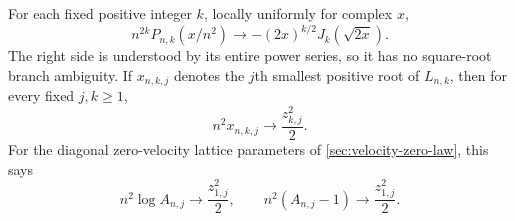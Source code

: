 \begin{theorem}
\label{thm:bessel-edge}
For each fixed positive integer $k$, locally uniformly for complex $x$,
\begin{equation}\label{eq:bessel-limit}
 n^{2k}P_{n,k}(x/n^2)
       \longrightarrow -(2x)^{k/2}J_k(\sqrt{2x}).
\end{equation}
The right side is understood by its entire power series, so it has
no square-root branch ambiguity. If $x_{n,k,j}$ denotes the $j$th
smallest positive root of $L_{n,k}$, then for every fixed $j,k\geq1$,
\begin{equation}\label{eq:small-root-limit}
 n^2x_{n,k,j}\longrightarrow \frac{z_{k,j}^2}{2}.
\end{equation}
For the diagonal zero-velocity lattice parameters of
\cref{sec:velocity-zero-law}, this says
\begin{equation}\label{eq:small-spacing-limit}
 n^2\log A_{n,j}\longrightarrow \frac{z_{1,j}^2}{2},
 \qquad n^2(A_{n,j}-1)\longrightarrow\frac{z_{1,j}^2}{2}.
\end{equation}
\end{theorem}
